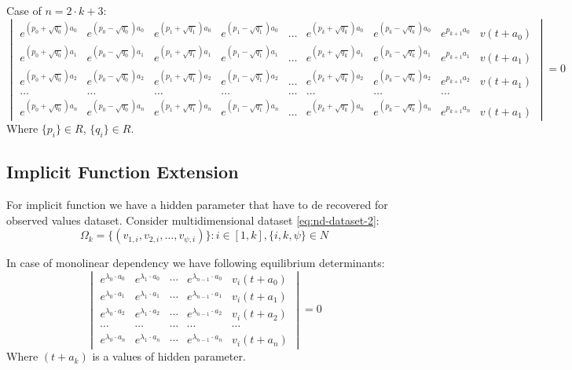 \documentclass[a4paper, 11pt, oneside]{book}
\begin{document}
Case of $n = 2 \cdot k + 3$:
\begin{equation}\label{eq:monolinear-f-pattern-2k-plus1-degrees-of-freedom}
  \begin{vmatrix}
    \displaystyle e^{(p_0+\sqrt{q_0})a_0} & e^{(p_0-\sqrt{q_0})a_0} & e^{(p_1+\sqrt{q_1})a_0} & e^{(p_1-\sqrt{q_1})a_0} & \ldots & e^{(p_k+\sqrt{q_k})a_0} & e^{(p_k-\sqrt{q_k})a_0} & e^{p_{k+1}a_0} & v(t+a_0) \\
    \displaystyle e^{(p_0+\sqrt{q_0})a_1} & e^{(p_0-\sqrt{q_0})a_1} & e^{(p_1+\sqrt{q_1})a_1} & e^{(p_1-\sqrt{q_1})a_1} & \ldots & e^{(p_k+\sqrt{q_k})a_1} & e^{(p_k-\sqrt{q_k})a_1} & e^{p_{k+1}a_1} & v(t+a_1) \\
    \displaystyle e^{(p_0+\sqrt{q_0})a_2} & e^{(p_0-\sqrt{q_0})a_2} & e^{(p_1+\sqrt{q_1})a_2} & e^{(p_1-\sqrt{q_1})a_2} & \ldots & e^{(p_k+\sqrt{q_k})a_2} & e^{(p_k-\sqrt{q_k})a_2} & e^{p_{k+1}a_2} & v(t+a_1) \\
    \ldots & \ldots & \ldots & \ldots & \ldots & \ldots & \ldots & \ldots \\
    \displaystyle e^{(p_0+\sqrt{q_0})a_n} & e^{(p_0-\sqrt{q_0})a_n} & e^{(p_1+\sqrt{q_1})a_n} & e^{(p_1-\sqrt{q_1})a_n} & \ldots & e^{(p_k+\sqrt{q_k})a_n} & e^{(p_k-\sqrt{q_k})a_n} & e^{p_{k+1}a_n} & v(t+a_1)
  \end{vmatrix}
  =0
\end{equation}
Where $\{p_i\} \in R$, $\{q_i\} \in R$.

\subsection{Implicit Function Extension}
For implicit function we have a hidden parameter that have to de recovered for observed values dataset. Consider multidimensional dataset \ref{eq:nd-dataset-2}:
\begin{equation}\label{eq:nd-dataset-2}
  \Omega_k = \{(v_{1, i}, v_{2, i}, \ldots, v_{\psi, i})\}: i \in [1, k], \{i, k, \psi\} \in N
\end{equation}

In case of monolinear dependency we have following equilibrium determinants:
\begin{equation}\label{eq:monolinear-implicit-f-pattern}
  \begin{vmatrix}
    e^{\lambda_0 \cdot a_0} & e^{\lambda_1 \cdot a_0} & \cdots & e^{\lambda_{n - 1} \cdot a_0} & v_i(t + a_0) \\
    e^{\lambda_0 \cdot a_1} & e^{\lambda_1 \cdot a_1} & \cdots & e^{\lambda_{n - 1} \cdot a_1} & v_i(t + a_1) \\
    e^{\lambda_0 \cdot a_2} & e^{\lambda_1 \cdot a_2} & \cdots & e^{\lambda_{n - 1} \cdot a_2} & v_i(t + a_2) \\
    \cdots & \cdots & \cdots & \cdots & \cdots \\
    e^{\lambda_0 \cdot a_n} & e^{\lambda_1 \cdot a_n} & \cdots & e^{\lambda_{n - 1} \cdot a_n} & v_i(t + a_n)
  \end{vmatrix}
  =0
\end{equation}
Where $(t + a_k)$ is a values of hidden parameter.
\end{document}
